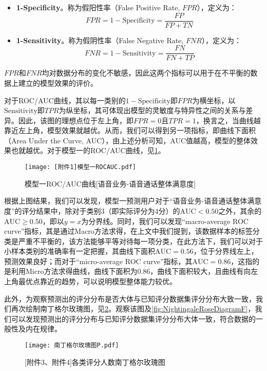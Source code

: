 \documentclass{MathorCupmodeling}
\begin{document}
\begin{itemize}
\begin{itemize}
			\item \textbf{1-Specificity}。称为假阳性率（False Positive Rate, $FPR$），定义为：
			\begin{equation}
				FPR=1-\mathrm{Specificity}=\frac{FP}{FP+TN} \label{FPR}
			\end{equation}
			\item \textbf{1-Sensitivity}。称为假阴性率（False Negative Rate, $FNR$），定义为：
			\begin{equation}
				FNR=1-\mathrm{Sensitivity}=\frac{FN}{FN+TP} \label{FNR}
			\end{equation}
		\end{itemize}
		$FPR$和$FNR$均对数据分布的变化不敏感\textcolor{blue}{\cite{procauc}}，因此这两个指标可以用于在不平衡的数据上建立的模型效果的评价。
		
		对于ROC/AUC曲线，其以每一类别的$1-\mathrm{Specificity}$即$FPR$为横坐标，以$\mathrm{Sensitivity}$即$TPR$为纵坐标，其可体现出模型的灵敏度与特异性之间的关系与差异。因此，该图的理想点位于左上角，即$FPR=0$且$TPR=1$，换言之，当曲线越靠近左上角，模型效果就越优。从而，我们可以得到另一项指标，即曲线下面积（Area Under the Curve, AUC），由上述分析可知，AUC值越高，模型的整体效果也就越优。对于模型一的ROC/AUC曲线，见\textcolor{blue}{\cref{fig:FirstModelROCAUC}}。
		\begin{figure}[H]
			\centerline{\texttt{[image: [附件1]模型一ROCAUC.pdf]}}
			\caption{模型一ROC/AUC曲线[语音业务-语音通话整体满意度]}\label{fig:FirstModelROCAUC}
		\end{figure}
		根据上图结果，我们可以发现，模型一预测用户对于“语音业务-语音通话整体满意度”的评分结果中，除对于类别$3$（即实际评分为$4$分）的$\mathrm{AUC}<0.50$之外，其余的$\mathrm{AUC}\geqslant0.50$，即以$y=x$为分界线。同时，我们可以发现“macro-average ROC curve”指标，其是通过Macro方法求得，在上文中我们提到，该数据样本的标签分类是严重不平衡的，该方法能够平等对待每一项分类，在此方法下，我们可以对于小样本类别的准确率有一定把握，其曲线下面积$\mathrm{AUC}=0.56$，位于分界线左上，预测效果良好；而对于“micro-average ROC curve”指标，其$\mathrm{AUC}=0.86$，这指的是利用Micro方法求得曲线，曲线下面积为0.86，曲线下面积较大，且曲线有向左上角最优点靠近的趋势，可以说明模型整体能力较优。
	\end{itemize}
	
	此外，为观察预测出的评分分布是否大体与已知评分数据集评分分布大致一致，我们再次绘制南丁格尔玫瑰图，见\textcolor{blue}{\cref{fig:NightingaleRoseDiagramP}}。观察该图及\textcolor{blue}{\cref{fig:NightingaleRoseDiagramF}}，我们可以发现预测出的评分分布与已知评分数据集评分分布大体一致，符合数据的一般性及内在规律。
	\begin{figure}[H]
		\centerline{\texttt{[image: 南丁格尔玫瑰图P.pdf]}}
		\caption{[附件3、附件4]各类评分人数南丁格尔玫瑰图}\label{fig:NightingaleRoseDiagramP}
	\end{figure}
\end{document}
